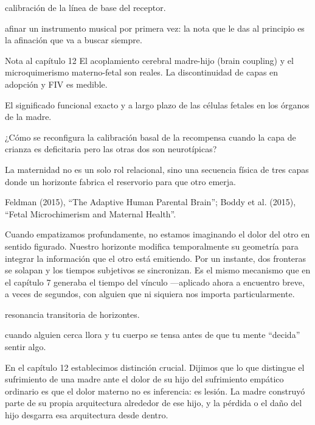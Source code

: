 \begin{fisica}
 calibración de la línea de base del receptor.

 afinar un instrumento musical por primera vez: la nota que le das al principio es la afinación que va a buscar siempre.
\end{fisica}
\begin{notacap}{Nota al capítulo 12}
 El acoplamiento cerebral madre-hijo (brain coupling) y el microquimerismo materno-fetal son reales. La discontinuidad de capas en adopción y FIV es medible.

 El significado funcional exacto y a largo plazo de las células fetales en los órganos de la madre.

 ¿Cómo se reconfigura la calibración basal de la recompensa cuando la capa de crianza es deficitaria pero las otras dos son neurotípicas?

 La maternidad no es un solo rol relacional, sino una secuencia física de tres capas donde un horizonte fabrica el reservorio para que otro emerja.

 Feldman (2015), “The Adaptive Human Parental Brain”; Boddy et al. (2015), “Fetal Microchimerism and Maternal Health”.
\end{notacap}
\noindent {}

Cuando empatizamos profundamente, no estamos imaginando el dolor del otro en sentido figurado. Nuestro horizonte modifica temporalmente su geometría para integrar la información que el otro está emitiendo. Por un instante, dos fronteras se solapan y los tiempos subjetivos se sincronizan. Es el mismo mecanismo que en el capítulo 7 generaba el tiempo del vínculo —aplicado ahora a encuentro breve, a veces de segundos, con alguien que ni siquiera nos importa particularmente.

\begin{fisica}
 resonancia transitoria de horizontes.

 cuando alguien cerca llora y tu cuerpo se tensa antes de que tu mente “decida” sentir algo.
\end{fisica}
\noindent En el capítulo 12 establecimos distinción crucial. Dijimos que lo que distingue el sufrimiento de una madre ante el dolor de su hijo del sufrimiento empático ordinario es que el dolor materno no es inferencia: es lesión. La madre construyó parte de su propia arquitectura alrededor de ese hijo, y la pérdida o el daño del hijo desgarra esa arquitectura desde dentro.

